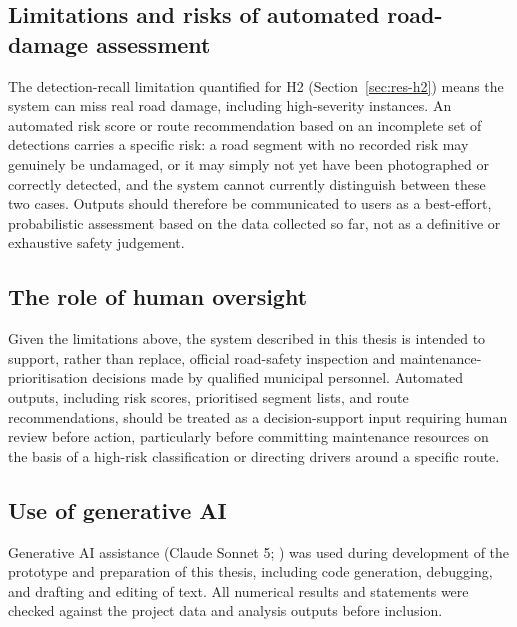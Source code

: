 \documentclass[10pt,a4paper,twocolumn]{article}
\begin{document}
\subsection{Limitations and risks of automated road-damage assessment}
\label{sec:ethics-risks}

The detection-recall limitation quantified for H2
(Section~\ref{sec:res-h2}) means the system can miss real road damage,
including high-severity instances. An automated risk score or
route recommendation based on an incomplete set of detections carries a
specific risk: a road segment with no recorded risk may genuinely be
undamaged, or it may simply not yet have been photographed or correctly
detected, and the system cannot currently distinguish between these two
cases. Outputs should therefore be communicated to users as a
best-effort, probabilistic assessment based on the data collected so
far, not as a definitive or exhaustive safety judgement.

\subsection{The role of human oversight}
\label{sec:ethics-oversight}

Given the limitations above, the system described in this thesis is
intended to support, rather than replace, official road-safety
inspection and maintenance-prioritisation decisions made by qualified
municipal personnel. Automated outputs, including risk scores,
prioritised segment lists, and route recommendations, should be treated
as a decision-support input requiring human review before action,
particularly before committing maintenance resources on the basis of a
high-risk classification or directing drivers around a specific route.

\subsection{Use of generative AI}
\label{sec:ethics-genai}

Generative AI assistance (Claude Sonnet 5; \citealt{anthropic2026claudesonnet5})
was used during development of the prototype and preparation of this
thesis, including code generation, debugging, and drafting and editing of
text. All numerical results and statements were checked against the
project data and analysis outputs before inclusion.

\end{document}
